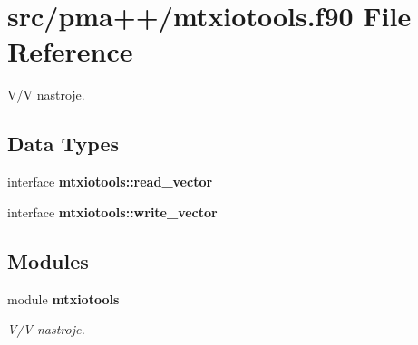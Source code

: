 \section{src/pma++/mtxiotools.f90 File Reference}
\label{mtxiotools_8f90}


V/V nastroje.  


\subsection*{Data Types}
\begin{DoxyCompactItemize}
\item 
interface {\bf mtxiotools\+::read\+\_\+vector}
\item 
interface {\bf mtxiotools\+::write\+\_\+vector}
\end{DoxyCompactItemize}
\subsection*{Modules}
\begin{DoxyCompactItemize}
\item 
module {\bf mtxiotools}
\begin{DoxyCompactList}\small\item\em V/V nastroje. \end{DoxyCompactList}\end{DoxyCompactItemize}
